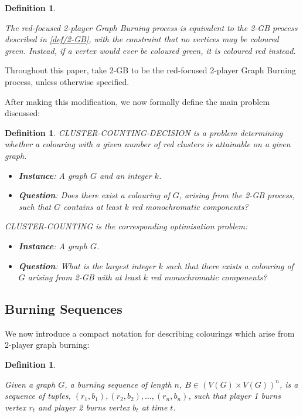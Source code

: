 \documentclass{mpaper}
\newtheorem{definition}[theorem]{Definition}
\begin{document}
\begin{definition}
  \label{def/2-GB-modified}
  
  The \emph{red-focused} 2-player Graph Burning process is equivalent to the 2-GB process described in \ref{def/2-GB}, with the constraint that no vertices may be coloured green. Instead, if a vertex would ever be coloured green, it is coloured red instead.
\end{definition}

Throughout this paper, take 2-GB to be the red-focused 2-player Graph Burning process, unless otherwise specified.

After making this modification, we now formally define the main problem discussed:

\begin{definition}
  \label{def/cluster-counting}
  CLUSTER-COUNTING-DECISION is a problem determining whether a colouring with a given number of red clusters is attainable on a given graph.
  
  \begin{itemize}
      \item \textbf{Instance}: A graph $G$ and an integer $k$.
      \item \textbf{Question}: Does there exist a colouring of $G$, arising from the 2-GB process, such that $G$ contains at least $k$ red monochromatic components?
  \end{itemize}
  
  CLUSTER-COUNTING is the corresponding optimisation problem:
  
  \begin{itemize}
      \item \textbf{Instance}: A graph $G$.
      \item \textbf{Question}: What is the largest integer $k$ such that there exists a colouring of $G$ arising from 2-GB with at least $k$ red monochromatic components?
  \end{itemize}
\end{definition}

\subsection{Burning Sequences}

We now introduce a compact notation for describing colourings which arise from 2-player graph burning:

\begin{definition}
\label{def/burning-sequence}

Given a graph $G$, a \emph{burning sequence} of length $n$, $B \in (V(G) \times V(G))^n$, is a sequence of tuples, $(r_1, b_1), (r_2, b_2), \dots, (r_n, b_n)$, such that player 1 burns vertex $r_t$ and player 2 burns vertex $b_t$ at time $t$.
\end{definition}
\end{document}
